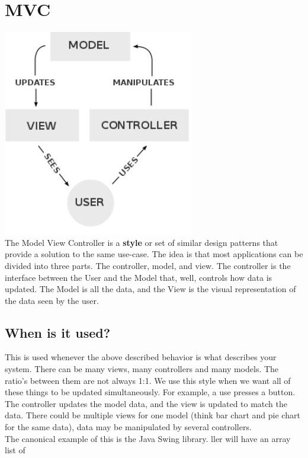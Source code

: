 \documentclass[12pt]{article}
\theoremstyle{definition}
\begin{document}
\section{MVC}
\includegraphics{mvc}\\
The Model View Controller is a \textbf{style} or set of similar design patterns that provide a solution to the same use-case. The idea is that most applications can be divided into three parts. The controller, model, and view. The controller is the interface between the User and the Model that, well, controls how data is updated. The Model is all the data, and the View is the visual representation of the data seen by the user.
\subsection{When is it used?}
This is used whenever the above described behavior is what describes your system. There can be many views, many controllers and many models. The ratio's between them are not always 1:1. We use this style when we want all of these things to be updated simultaneously. For example, a use presses a button. The controller updates the model data, and the view is updated to match the data. There could be multiple views for one model (think bar chart and pie chart for the same data), data may be manipulated by several controllers.
\\ \linebreak
The canonical example of this is the Java Swing library. 
ller will have an array list of  
\end{document}
